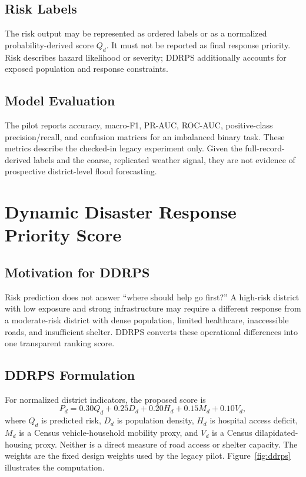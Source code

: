 \documentclass[conference]{IEEEtran}
\begin{document}
\subsection{Risk Labels}
The risk output may be represented as ordered labels or as a normalized
probability-derived score $Q_d$. It must not be reported as final response
priority. Risk describes hazard likelihood or severity; DDRPS additionally
accounts for exposed population and response constraints.

\subsection{Model Evaluation}
The pilot reports accuracy, macro-F1, PR-AUC, ROC-AUC, positive-class
precision/recall, and confusion matrices for an imbalanced binary task. These
metrics describe the checked-in legacy experiment only. Given the
full-record-derived labels and the coarse, replicated weather signal, they are
not evidence of prospective district-level flood forecasting.

\section{Dynamic Disaster Response Priority Score}

\subsection{Motivation for DDRPS}
Risk prediction does not answer ``where should help go first?'' A high-risk
district with low exposure and strong infrastructure may require a different
response from a moderate-risk district with dense population, limited
healthcare, inaccessible roads, and insufficient shelter. DDRPS converts these
operational differences into one transparent ranking score.

\subsection{DDRPS Formulation}
For normalized district indicators, the proposed score is
\begin{equation}
\label{eq:ddrps}
P_d=0.30Q_d+0.25D_d+0.20H_d+0.15M_d+0.10V_d,
\end{equation}
where $Q_d$ is predicted risk, $D_d$ is population density, $H_d$ is hospital
access deficit, $M_d$ is a Census vehicle-household mobility proxy, and $V_d$
is a Census dilapidated-housing proxy. Neither is a direct measure of road
access or shelter capacity. The weights are the fixed design weights used by
the legacy pilot. Figure~\ref{fig:ddrps} illustrates the computation.
\end{document}
